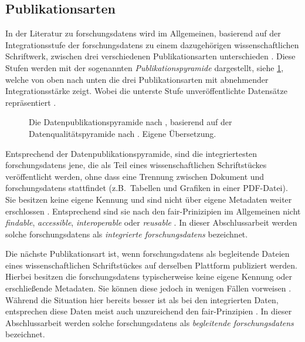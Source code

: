 \subsection{Publikationsarten}\label{sec:forschungsstand-basics-publicationtypes}
In der Literatur zu \glspl{forschungsdaten} wird im Allgemeinen, basierend auf der Integrationsstufe der \glspl{forschungsdaten} zu einem dazugehörigen wissenschaftlichen Schriftwerk, zwischen drei verschiedenen Publikationsarten unterschieden \autocite{ReillyEtAl2011}.
Diese Stufen werden mit der sogenannten \textit{Publikationspyramide} dargestellt, siehe \cref{fig:data-pyramid}, welche von oben nach unten die drei Publikationsarten mit abnehmender Integrationsstärke zeigt. 
Wobei die unterste Stufe unveröffentlichte Datensätze repräsentiert \autocite{ReillyEtAl2011}.
\begin{figure}[!htbp]
    \centering
    \resizebox{.8\textwidth}{!}{}
    \caption{Die Datenpublikationspyramide nach \citeauthor{ReillyEtAl2011} \autocite{ReillyEtAl2011}, basierend auf der Datenqualitätspyramide nach \citeauthor{Gray2009} \autocite{Gray2009}.
    Eigene Übersetzung.}
    \label{fig:data-pyramid}
\end{figure}

Entsprechend der Datenpublikationspyramide, sind die integriertesten \glspl{forschungsdaten} jene, die als Teil eines wissenschaftlichen Schriftstückes veröffentlicht werden, ohne dass eine Trennung zwischen Dokument und \glspl{forschungsdaten} stattfindet (z.B.~Tabellen und Grafiken in einer PDF-Datei).
Sie besitzen keine eigene Kennung und sind nicht über eigene Metadaten weiter erschlossen \autocite{ReillyEtAl2011}.
Entsprechend sind sie nach den \gls{fair}-Prinizipien im Allgemeinen nicht \textit{findable}, \textit{accessible}, \textit{interoperable} oder \textit{reusable} \autocite[vgl.][]{ReillyEtAl2011}.
In dieser Abschlussarbeit werden solche \glspl{forschungsdaten} als \textit{integrierte \glspl{forschungsdaten}} bezeichnet.

Die nächste Publikationsart ist, wenn \glspl{forschungsdaten} als begleitende Dateien eines wissenschaftlichen Schriftstückes auf derselben Plattform publiziert werden.
Hierbei besitzen die \glspl{forschungsdaten} typischerweise keine eigene Kennung oder erschließende Metadaten.
Sie können diese jedoch in wenigen Fällen vorweisen \autocite{ReillyEtAl2011}.
Während die Situation hier bereits besser ist als bei den integrierten Daten, entsprechen diese Daten meist auch unzureichend den \gls{fair}-Prinzipien \autocite[vgl.][]{ReillyEtAl2011}.
In dieser Abschlussarbeit werden solche \glspl{forschungsdaten} als \textit{begleitende \glspl{forschungsdaten}} bezeichnet.

